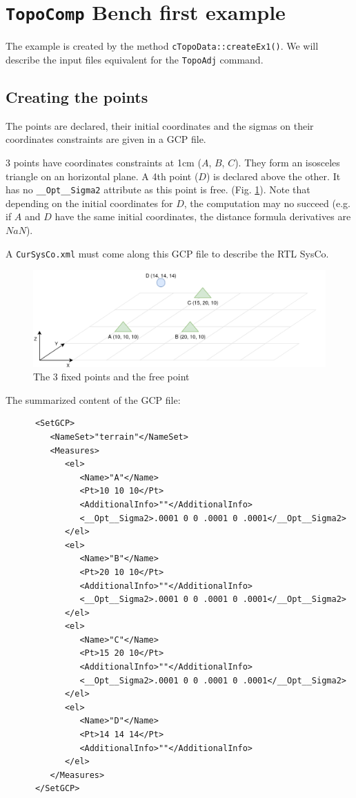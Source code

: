 \section{\texttt{TopoComp} Bench first example}
\label{subsec:topoBench}

The example is created by the method \texttt{cTopoData::createEx1()}.
We will describe the input files equivalent for the \texttt{TopoAdj} command.


\subsection{Creating the points}

The points are declared, their initial coordinates and the sigmas on their coordinates constraints
are given in a GCP file. 

3 points have coordinates constraints at 1cm ($A$, $B$, $C$). They form an isosceles triangle
on an horizontal plane.
A 4th point ($D$) is declared above the other. It has no {\tt \_\_Opt\_\_Sigma2} attribute as this point is free.
(Fig. \ref{fig:topoEx1}). Note that depending on the initial coordinates for $D$, the computation may no succeed
(e.g. if $A$ and $D$ have the same initial coordinates, the distance formula derivatives are $NaN$).

A {\tt CurSysCo.xml} must come along this GCP file to describe the RTL SysCo.


\begin{figure}[!h]
\centering
\includegraphics[width=12cm]{Programmer/benchtopo1b.png}
\caption{The 3 fixed points and the free point}
\label{fig:topoEx1}
\end{figure}

The summarized content of the GCP file:

\begin{lstlisting}
      <SetGCP>
         <NameSet>"terrain"</NameSet>
         <Measures>
            <el>
               <Name>"A"</Name>
               <Pt>10 10 10</Pt>
               <AdditionalInfo>""</AdditionalInfo>
               <__Opt__Sigma2>.0001 0 0 .0001 0 .0001</__Opt__Sigma2>
            </el>
            <el>
               <Name>"B"</Name>
               <Pt>20 10 10</Pt>
               <AdditionalInfo>""</AdditionalInfo>
               <__Opt__Sigma2>.0001 0 0 .0001 0 .0001</__Opt__Sigma2>
            </el>
            <el>
               <Name>"C"</Name>
               <Pt>15 20 10</Pt>
               <AdditionalInfo>""</AdditionalInfo>
               <__Opt__Sigma2>.0001 0 0 .0001 0 .0001</__Opt__Sigma2>
            </el>
            <el>
               <Name>"D"</Name>
               <Pt>14 14 14</Pt>
               <AdditionalInfo>""</AdditionalInfo>
            </el>
         </Measures>
      </SetGCP>
\end{lstlisting}


